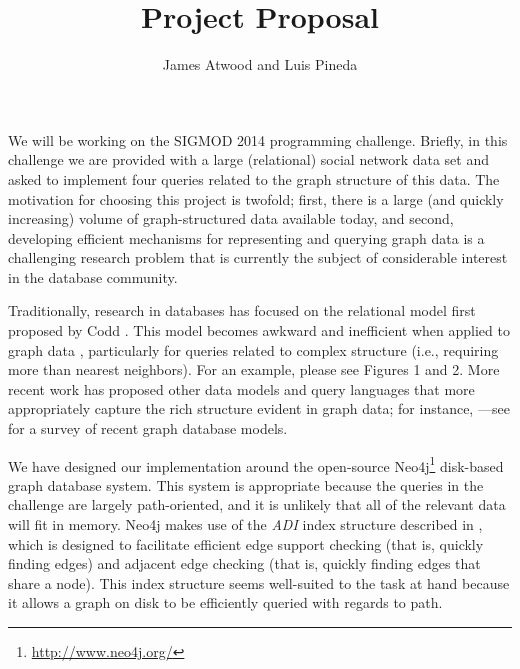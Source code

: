 \documentclass{article}
\title{Project Proposal}
\author{
James Atwood and Luis Pineda \\ %
}
\begin{document}
\maketitle

We will be working on the SIGMOD 2014 programming challenge.  Briefly,
in this challenge we are provided with a large (relational) social
network data set and asked to implement four queries related to the
graph structure of this data.  The motivation for choosing this
project is twofold; first, there is a large (and quickly increasing)
volume of graph-structured data available today, and second,
developing efficient mechanisms for representing and querying graph
data is a challenging research problem that is currently the subject
of considerable interest in the database community.

Traditionally, research in databases has focused on the relational
model first proposed by Codd \cite{codd1970relational}.  This model
becomes awkward and inefficient when applied to graph data
\cite{rodriguez2011graph}, particularly for queries related to
complex structure (i.e., requiring more than nearest neighbors).  For
an example, please see \cite{he2008graphs} Figures 1 and 2.  More
recent work has proposed other data models and query languages that
more appropriately capture the rich structure evident in graph data;
for instance,
\cite{he2008graphs,sun2012efficient,low2010graphlab}---see
\cite{angles2008survey} for a survey of recent graph database
models.  


We have designed our implementation around the open-source
Neo4j\footnote{\url{http://www.neo4j.org/}} disk-based graph database
system.  This system is appropriate because the queries in the
challenge are largely path-oriented, and it is unlikely that all of
the relevant data will fit in memory.  Neo4j makes use of the
\emph{ADI} index structure \cite[Chapter~6]{IanRobinson:2013ul} described in \cite{wang2004scalable}, which
is designed to facilitate efficient edge support checking (that is,
quickly finding edges) and adjacent edge checking (that is, quickly
finding edges that share a node).
This index structure seems well-suited to the task at hand because it
allows a graph on disk to be efficiently queried with regards to path.
\end{document}
